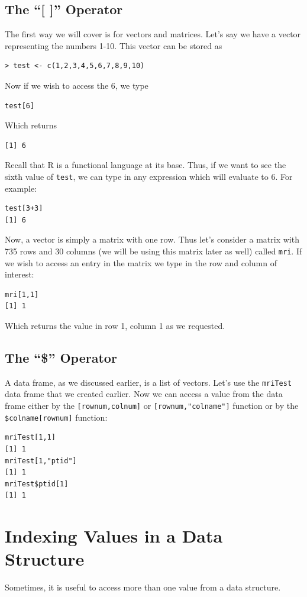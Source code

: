 \documentclass[11pt,letterpaper,fleqn]{report}
\begin{document}
\subsection{The ``[ ]'' Operator}
The first way we will cover is for vectors and matrices. Let's say we have a vector representing the numbers 1-10. This vector can be stored as \begin{verbatim}> test <- c(1,2,3,4,5,6,7,8,9,10) \end{verbatim} Now if we wish to access the 6, we type 
\begin{verbatim}
test[6] 
\end{verbatim}
Which returns
\begin{verbatim}
[1] 6
\end{verbatim} 
Recall that R is a functional language at its base. Thus, if we want to see the sixth value of \texttt{test}, we can type in any expression which will evaluate to 6. For example:
\begin{verbatim}
test[3+3]
[1] 6
\end{verbatim}
Now, a vector is simply a matrix with one row. Thus let's consider a matrix with 735 rows and 30 columns (we will be using this matrix later as well) called \texttt{mri}. If we wish to access an entry in the matrix we type in the row and column of interest: 
\begin{verbatim}
mri[1,1]
[1] 1
\end{verbatim}
Which returns the value in row 1, column 1 as we requested.

\subsection{The ``\$'' Operator}
A data frame, as we discussed earlier, is a list of vectors. Let's use the \texttt{mriTest} data frame that we created earlier. Now we can access a value from the data frame either by the \texttt{[rownum,colnum]} or \texttt{[rownum,"colname"]} function or by the \texttt{\$colname[rownum]} function:
\begin{verbatim}
mriTest[1,1]
[1] 1 
mriTest[1,"ptid"]
[1] 1 
mriTest$ptid[1]
[1] 1 
\end{verbatim}

\section{Indexing Values in a Data Structure}
Sometimes, it is useful to access more than one value from a data structure. 
\end{document}

